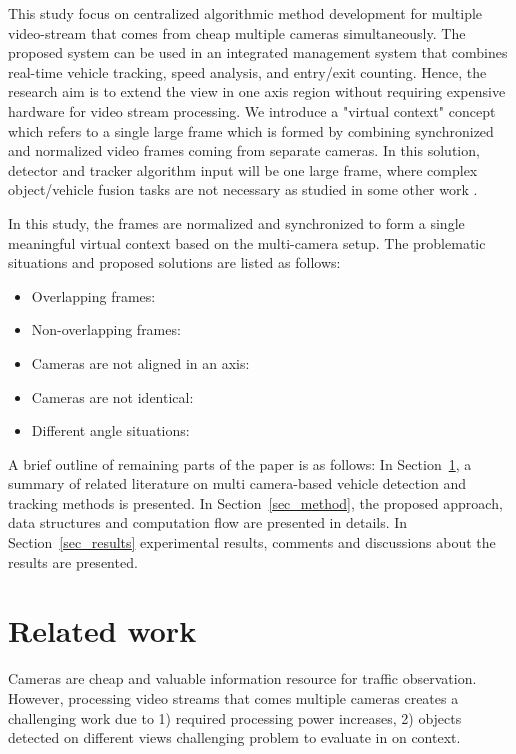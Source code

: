 \documentclass[5p,twocolumn,english]{elsarticle}
\begin{document}
This study focus on centralized algorithmic method development for multiple video-stream that comes from cheap multiple cameras simultaneously. The proposed system can be used in an integrated management system that combines real-time vehicle tracking, speed analysis, and entry/exit counting. Hence, the research aim is to extend the view in one axis region without requiring expensive hardware for video stream processing. We introduce a "virtual context" concept which refers to a single large frame which is formed by combining synchronized and normalized video frames coming from separate cameras. In this solution, detector and tracker algorithm input will be one large frame, where complex object/vehicle fusion tasks are not necessary as studied in some other work \cite{land11060886}.

In this study, the frames are normalized and synchronized to form a single meaningful virtual context based on the multi-camera setup. The problematic situations and proposed solutions are listed as follows:
\begin{itemize}
	\item Overlapping frames:
	\item Non-overlapping frames:
	\item Cameras are not aligned in an axis:
	\item Cameras are not identical:
	\item Different angle situations:
\end{itemize}  

A brief outline of remaining parts of the paper is as follows: In Section~\ref{sec_related}, a summary of related literature on multi camera-based vehicle detection and tracking methods is presented.  In Section~\ref{sec_method}, the proposed approach, data structures and computation flow are presented in details.  In Section~\ref{sec_results} experimental results, comments and discussions about the results are presented.

\section{Related work}
\label{sec_related}

Cameras are cheap and valuable information resource for traffic observation. However, processing video streams that comes multiple cameras creates a challenging work due to 1) required processing power increases, 2) objects detected on different views challenging problem to evaluate in on context.
\end{document}
